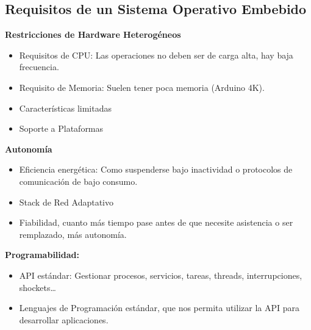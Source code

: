 \documentclass[12pt, twoside, openright]{report} %
\begin{document}
\subsection{Requisitos de un Sistema Operativo Embebido}
\textbf{Restricciones de Hardware Heterogéneos}
\begin{itemize}
	\item Requisitos de CPU: Las operaciones no deben ser de carga alta, hay baja frecuencia.
	\item Requisito de Memoria: Suelen tener poca memoria (Arduino 4K).
	\item Características limitadas
	\item Soporte a Plataformas
\end{itemize}

\textbf{Autonomía}
\begin{itemize}
	\item Eficiencia energética: Como suspenderse bajo inactividad o protocolos de comunicación de bajo consumo.
	\item Stack de Red Adaptativo
	\item Fiabilidad, cuanto más tiempo pase antes de que necesite asistencia o ser remplazado, más autonomía.
\end{itemize}

\textbf{Programabilidad:}
\begin{itemize}
	\item API estándar: Gestionar procesos, servicios, tareas, threads, interrupciones, shockets…
	\item Lenguajes de Programación estándar, que nos permita utilizar la API para desarrollar aplicaciones.
\end{itemize}
\end{document}
